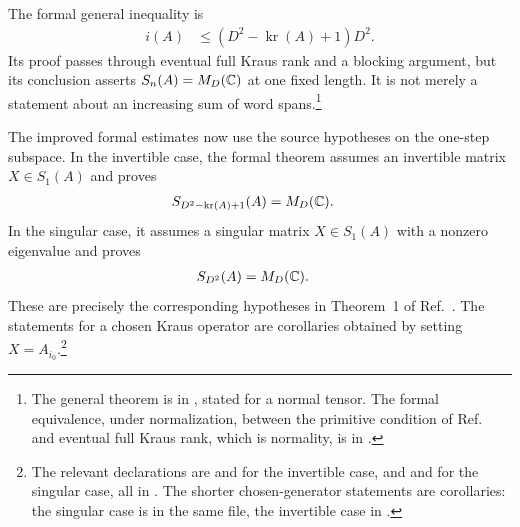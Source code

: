 \documentclass{article}
\begin{document}
The formal general inequality is
\begin{align}
    i(A)
        &\leq
        (D^2-\operatorname{kr}(A)+1)D^2.
    \label{eq:spwc10_wielandt_one_step_subspace_general_formal_bound}
\end{align}
Its proof passes through eventual full Kraus rank and a blocking argument, but
its conclusion asserts $S_n(A)=M_D(\mathbb{C})$ at one fixed length. It is not merely a
statement about an increasing sum of word spans.\footnote{The general theorem
    is  in
    , stated for a normal
    tensor. The formal
    equivalence, under normalization, between the primitive condition of
    Ref.~\cite{Sanz2010Quantum} and eventual full Kraus rank, which is
    normality, is  in
    .}

The improved formal estimates now use the source hypotheses on the one-step
subspace. In the invertible case, the formal theorem assumes an invertible
matrix $X\in S_1(A)$ and proves
\begin{align}
    S_{D^2-\operatorname{kr}(A)+1}(A)
        &=
        M_D(\mathbb{C}).
    \label{eq:spwc10_wielandt_one_step_subspace_invertible_exact_span}
\end{align}
In the singular case, it assumes a singular matrix $X\in S_1(A)$ with a
nonzero eigenvalue and proves
\begin{align}
    S_{D^2}(A)
        &=
        M_D(\mathbb{C}).
    \label{eq:spwc10_wielandt_one_step_subspace_singular_exact_span}
\end{align}
These are precisely the corresponding hypotheses in Theorem~1 of
Ref.~\cite{Sanz2010Quantum}. The statements for a chosen Kraus operator
are corollaries obtained by setting $X=A_{i_0}$.\footnote{The relevant
    declarations are
    and
     for the
    invertible case, and
    and
    for the singular case, all in
    . The shorter
    chosen-generator statements are corollaries: the singular case is in the
    same file, the invertible case in
    .}
\end{document}
